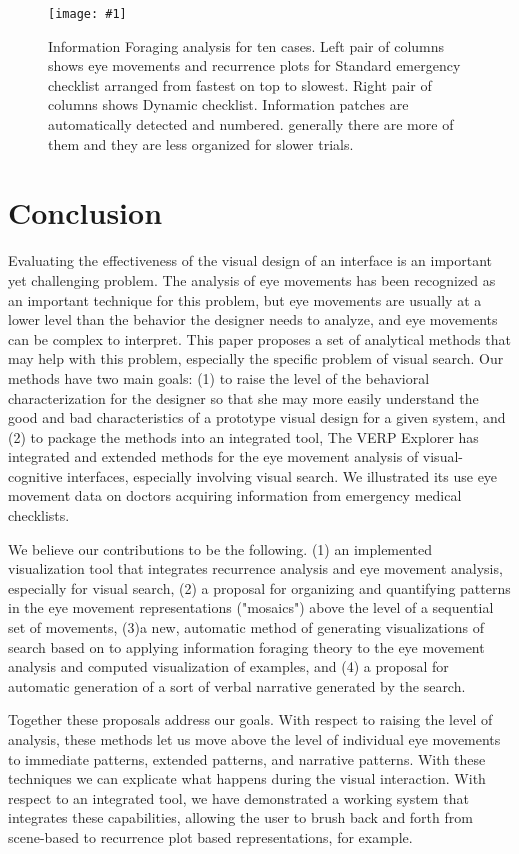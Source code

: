 \documentclass[journal]{vgtc}                %
\newcommand{\insertpicture}[2]{\begin{center}\texttt{[image: \#1]}\end{center}}
\begin{document}
\begin{figure}
	\insertpicture{figures/table.pdf}{0.4}
	\caption{Information Foraging analysis for ten cases. Left pair of columns shows eye movements and recurrence plots for Standard emergency checklist arranged from fastest on top to slowest. Right pair of columns shows Dynamic checklist. Information patches are automatically detected and numbered. generally there are more of them and they are less organized for slower trials. \label{fig:cases}}
\end{figure}


\section{Conclusion} 
Evaluating the effectiveness of the visual design of an
interface is an important yet challenging problem. The analysis of eye movements has been recognized as an important technique for this problem, but eye movements are usually at a lower level than the behavior the designer needs to analyze, and eye movements can be complex to interpret.
This paper proposes a set
of analytical methods that may help with this problem, especially the
specific problem of visual search. Our methods have two main goals: (1) to
raise the level of the behavioral characterization for the designer so that
she may more easily understand the good and bad characteristics of a
prototype visual design for a given system, and (2) to package the methods
into an integrated tool, The VERP Explorer has integrated and extended methods for the eye movement analysis of visual-cognitive interfaces, especially involving visual search. We illustrated its use eye movement data on doctors acquiring information from emergency medical checklists.

We believe our contributions to be the following. (1) an implemented visualization tool that integrates recurrence analysis and eye movement analysis, especially for visual search, (2) a proposal for organizing and quantifying patterns in the eye movement representations  ("mosaics") above the level of a sequential set of movements, (3)a new, automatic method of generating visualizations of search based on to applying information foraging theory to the eye movement analysis and computed visualization of examples, and (4) a proposal for automatic generation of a sort of verbal narrative generated by the search.

Together these proposals address our goals. With respect to raising the level of analysis, these methods let us move above the level of individual eye movements to immediate patterns, extended patterns, and narrative patterns. With these techniques we can explicate what happens during the visual interaction. With respect to an integrated tool, we have demonstrated a working system that integrates these capabilities, allowing the user to brush back and forth from scene-based to recurrence plot based representations, for example.
\end{document}
